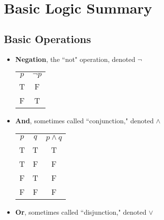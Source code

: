 \documentclass{article}
\begin{document}




\setcounter{section}{0}
\section{Basic Logic Summary}

    \subsection{Basic Operations}
        \begin{itemize}
            \item \textbf{Negation}, the ``not" operation, denoted $\neg$ 
            \hspace{0.5em}
            
            \begin{tabular}{c||c}
                $p$ & $\neg{p}$ \\
                \cline{1-2}
                T & F \\
                F & T \\
                
            \end{tabular}
            
            \item \textbf{And}, sometimes called ``conjunction," denoted $\land$ 
            \hspace{0.5em}
        
            \begin{tabular}{c|c||c}
                $p$ & $q$ & $p \land q$ \\
                \cline{1-3}
                T & T & T \\
                T & F & F \\
                F & T & F \\
                F & F & F \\
            \end{tabular}
        
            \item \textbf{Or}, sometimes called ``disjunction," denoted $\lor$
            \hspace{0.5em}
        

\end{itemize}
\end{document}
